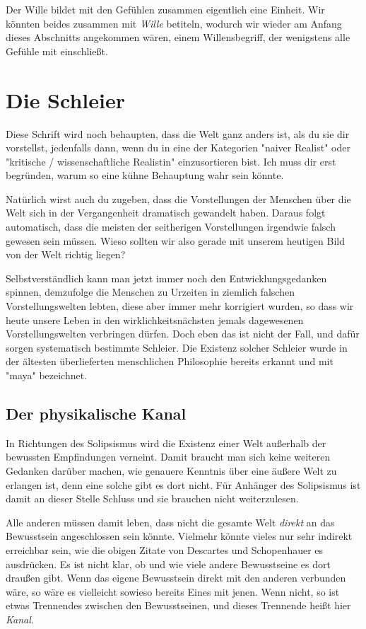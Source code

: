 \documentclass[12pt]{book}
\begin{document}
Der Wille bildet mit den Gefühlen zusammen eigentlich eine Einheit. Wir könnten beides zusammen mit \emph{Wille} betiteln, wodurch wir wieder am Anfang dieses Abschnitts angekommen wären, einem Willensbegriff, der wenigstens alle Gefühle mit einschließt.

\section{Die Schleier}

Diese Schrift wird noch behaupten, dass die Welt ganz anders ist, als du sie dir  vorstellst, jedenfalls dann, wenn du in eine der Kategorien "naiver Realist" oder "kritische / wissenschaftliche Realistin" einzusortieren bist. Ich muss dir erst begründen, warum so eine kühne Behauptung wahr sein könnte.

Natürlich wirst auch du zugeben, dass die Vorstellungen der Menschen über die Welt sich in der Vergangenheit dramatisch gewandelt haben. Daraus folgt automatisch, dass die meisten der seitherigen Vorstellungen irgendwie falsch gewesen sein müssen. Wieso sollten wir also gerade mit unserem heutigen Bild von der Welt richtig liegen?

Selbstverständlich kann man jetzt immer noch den Entwicklungsgedanken spinnen, demzufolge die Menschen zu Urzeiten in ziemlich falschen Vorstellungswelten lebten, diese aber immer mehr korrigiert wurden, so dass wir heute unsere Leben in den wirklichkeitsnächsten jemals dagewesenen Vorstellungswelten verbringen dürfen. Doch eben das ist nicht der Fall, und dafür sorgen systematisch bestimmte Schleier. Die Existenz solcher Schleier wurde in der ältesten überlieferten menschlichen Philosophie bereits erkannt und mit "maya" bezeichnet.

\subsection{Der physikalische Kanal}

In Richtungen des Solipsismus wird die Existenz einer Welt außerhalb der bewussten Empfindungen verneint. Damit braucht man sich keine weiteren Gedanken darüber machen, wie genauere Kenntnis über eine äußere Welt zu erlangen ist, denn eine solche gibt es dort nicht. Für Anhänger des Solipsismus ist damit an dieser Stelle Schluss und sie brauchen nicht weiterzulesen.

Alle anderen müssen damit leben, dass nicht die gesamte Welt \emph{direkt} an das Bewusstsein angeschlossen sein könnte. Vielmehr könnte vieles nur sehr indirekt erreichbar sein, wie die obigen Zitate von Descartes und Schopenhauer es ausdrücken. Es ist nicht klar, ob und wie viele andere Bewusstseine es dort draußen gibt. Wenn das eigene Bewusstsein direkt mit den anderen verbunden wäre, so wäre es vielleicht sowieso bereits Eines mit jenen. Wenn nicht, so ist etwas Trennendes zwischen den Bewusstseinen, und dieses Trennende heißt hier \emph{Kanal}.
\end{document}
